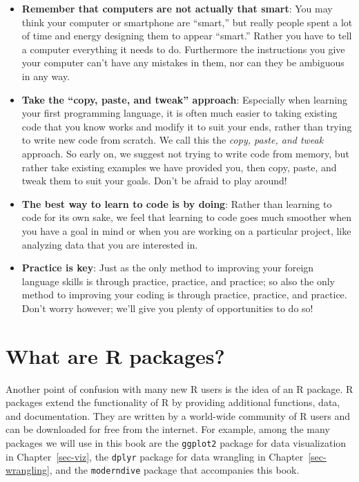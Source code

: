 \documentclass[
  letterpaper,
  DIV=11,
  numbers=noendperiod]{scrreprt}
\theoremstyle{definition}
\theoremstyle{remark}
\begin{document}
\begin{itemize}
\item
  \textbf{Remember that computers are not actually that smart}: You may
  think your computer or smartphone are ``smart,'' but really people
  spent a lot of time and energy designing them to appear ``smart.''
  Rather you have to tell a computer everything it needs to do.
  Furthermore the instructions you give your computer can't have any
  mistakes in them, nor can they be ambiguous in any way.
\item
  \textbf{Take the ``copy, paste, and tweak'' approach}: Especially when
  learning your first programming language, it is often much easier to
  taking existing code that you know works and modify it to suit your
  ends, rather than trying to write new code from scratch. We call this
  the \emph{copy, paste, and tweak} approach. So early on, we suggest
  not trying to write code from memory, but rather take existing
  examples we have provided you, then copy, paste, and tweak them to
  suit your goals. Don't be afraid to play around!
\item
  \textbf{The best way to learn to code is by doing}: Rather than
  learning to code for its own sake, we feel that learning to code goes
  much smoother when you have a goal in mind or when you are working on
  a particular project, like analyzing data that you are interested in.
\item
  \textbf{Practice is key}: Just as the only method to improving your
  foreign language skills is through practice, practice, and practice;
  so also the only method to improving your coding is through practice,
  practice, and practice. Don't worry however; we'll give you plenty of
  opportunities to do so!
\end{itemize}

\hypertarget{sec-packages}{%
\section{What are R packages?}\label{sec-packages}}

Another point of confusion with many new R users is the idea of an R
package. R packages extend the functionality of R by providing
additional functions, data, and documentation. They are written by a
world-wide community of R users and can be downloaded for free from the
internet. For example, among the many packages we will use in this book
are the \texttt{ggplot2} package for data visualization in
Chapter~\ref{sec-viz}, the \texttt{dplyr} package for data wrangling in
Chapter~\ref{sec-wrangling}, and the \texttt{moderndive} package that
accompanies this book.
\end{document}
